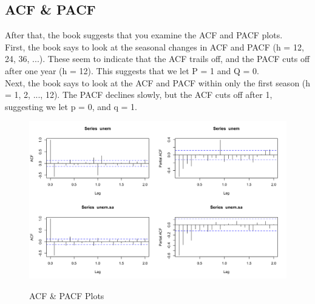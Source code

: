   \subsection{ACF \& PACF}
  
  After that, the book suggests that you examine the ACF and PACF plots.\\
  
  First, the book says to look at the seasonal changes in ACF and PACF (h = 12, 24, 36, ...). These seem to indicate that the ACF trails off, and the PACF cuts off after one year (h = 12). This suggests that we let P = 1 and Q = 0.\\
  
  Next, the book says to look at the ACF and PACF within only the first season (h = 1, 2, ..., 12). The PACF declines slowly, but the ACF cuts off after 1, suggesting we let p = 0, and q = 1.\\
  

      \begin{figure}[H]
      	\centering
      	\caption{ACF \& PACF Plots}
      	\includegraphics[width=\linewidth]{images/acfpacf}
      	\label{fig:secdiff}
      \end{figure}

